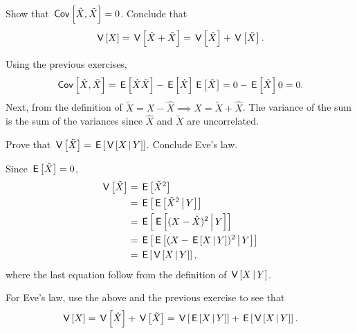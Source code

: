 \documentclass[assignments]{subfiles}
\begin{document}
\begin{exercise}
Show that $\,\mathsf{Cov}\left[\hat X, \tilde X\right] = 0$. Conclude that
\begin{equation}
\label{eq:8}
\V{X} = \V{\hat X + \tilde X} = \V{\hat X} + \V{\tilde X}.
\end{equation}
\begin{solution}
Using the previous exercises,
\begin{equation}
\label{eq:7}
\cov{\hat X, \tilde X} = \E{\hat X \tilde X} - \E{\hat X} \E{\tilde X} = 0 - \E{\hat X} 0 = 0.
\end{equation}
Next, from the definition of $\tilde X = X - \hat X \implies X = \tilde X + \hat X$.
The variance of the sum is the sum of the variances since $\hat X$ and $\tilde X$ are uncorrelated.
\end{solution}
\end{exercise}

\begin{exercise}
Prove that $\,\mathsf{V}\left[\tilde X\right] = \,\mathsf{E}\left[\,\mathsf{V}\left[X\,\middle|\, Y\right]\right]$. Conclude Eve's law.
\begin{solution}
Since $\,\mathsf{E}\left[\tilde X\right] = 0$,
\begin{align}
\label{eq:9}
\V{\tilde X} &= \E{\tilde X^{2}}  \\
&= \E{\E{\tilde X^{2}\given Y}} \\
&= \E{\E{(X - \hat X)^{2}\given Y}} \\
&= \E{\E{(X - \E{X\given Y})^{2}\given Y}} \\
&= \E{\V{X\given Y}},
\end{align}
where the last equation follow from the definition of $\,\mathsf{V}\left[X\,\middle|\, Y\right]$.

For Eve's law, use the above and the previous exercise to see that
\begin{equation}
\label{eq:10}
\V{X} = \V{\hat X} + \V{\tilde X} = \V{\E{X\given Y}} + \E{\V{X\given Y}}.
\end{equation}
\end{solution}
\end{exercise}
\end{document}
